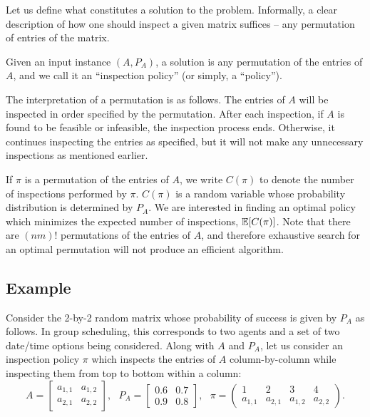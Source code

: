  Let us define what constitutes a solution to the problem.  Informally, a clear description of how one should inspect a given matrix suffices -- any permutation of entries of the matrix.
 \begin{definition}
 	Given an input instance $(A,P_{A})$, a solution is any permutation of the entries of $A$, and we call it an ``inspection policy'' (or simply, a ``policy'').
 \end{definition}
 The interpretation of a permutation is as follows. The entries of $A$ will be inspected in order specified by the permutation. After each inspection, if $A$ is found to be feasible or infeasible, the inspection process ends. Otherwise, it continues inspecting the entries as specified, but it will not make any unnecessary inspections as mentioned earlier. 

 If $\pi$ is a permutation of the entries of $A$, we write $C(\pi)$ to denote the number of inspections performed by $\pi$. $C(\pi)$ is a random variable whose probability distribution is determined by $P_A$. We are interested in finding an optimal policy which minimizes the expected number of inspections, $\mathbb{E}[C(\pi)]$.
 Note that there are $(nm)!$ permutations of the entries of $A$, and therefore exhaustive search for an optimal permutation will not produce an efficient algorithm. 

 \subsection{Example} \label{matrix:sec:example}
Consider the 2-by-2 random matrix whose probability of success is given by $P_A$ as follows. In group scheduling, this corresponds to two agents and a set of two date/time options being considered. Along with $A$ and $P_A$, let us consider an inspection policy $\pi$ which inspects the entries of $A$ column-by-column while inspecting them from top to bottom within a column:
 \begin{equation*}
 A = 
 	\begin{bmatrix}
 		a_{1,1}  & a_{1, 2} \\
 		a_{2,1}  & a_{2, 2}
 	\end{bmatrix}, ~~~
 P_A = 
 	\begin{bmatrix}
 		0.6  & 0.7  \\
 		0.9  & 0.8 
 	\end{bmatrix}, ~~~
 	\pi = 
 	\begin{pmatrix} 
 	1 & 2 & 3 & 4  \\
 	a_{1,1} & a_{2,1} & a_{1,2} & a_{2,2} 
 	\end{pmatrix}.
 \end{equation*}
 
